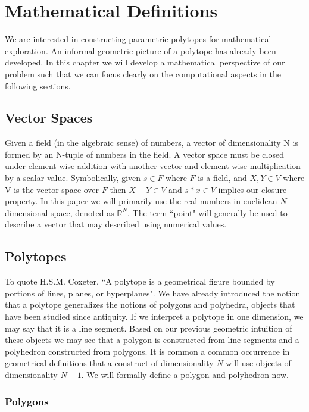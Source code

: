 
\chapter{Mathematical Definitions}

We are interested in constructing parametric polytopes for
mathematical exploration. An informal geometric
picture of a polytope has already been developed.
In this chapter we will develop a mathematical perspective of our problem
such that we can focus clearly on the computational aspects in the following
sections. 


\section{Vector Spaces}

Given a field (in the algebraic sense) of numbers, a vector of dimensionality
N is formed by an N-tuple of numbers in the field. A vector space must
be closed under element-wise addition with another vector and element-wise
multiplication by a scalar value. Symbolically, given $s \in F$ where $F$ is a
field, and $X,Y \in V$ where V is the vector space over $F$ then
$X+Y \in V$ and $s*x \in V$ implies our closure property.
In this paper we will primarily use
the real numbers in euclidean $N$ dimensional space, denoted as $\mathbb{R}^N$.
The term ``point" will generally be used to describe a vector that may
described using numerical values.

\section{Polytopes}

To quote H.S.M. Coxeter, ``A polytope is a geometrical figure bounded by portions of
lines, planes, or hyperplanes". We have already introduced the notion that a
polytope generalizes the notions of polygons and polyhedra, objects
that have been studied since antiquity. If we interpret a polytope in
one dimension, we may say that it is a line segment. Based on our previous
geometric intuition of these objects we may see that a polygon is constructed
from line segments and a polyhedron constructed from polygons. It is common
a common occurrence in geometrical definitions that a construct of dimensionality
$N$ will use objects of dimensionality $N-1$. We will formally define a polygon
and polyhedron now.

\subsection{Polygons}

